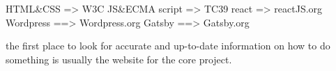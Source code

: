 HTML&CSS   =>  W3C     
JS&ECMA script   =>  TC39
react => reactJS.org
Wordpress ==> Wordpress.org
Gatsby ==> Gatsby.org 

the first place to look for accurate and up-to-date information on how to do something is usually the website for the core project.
